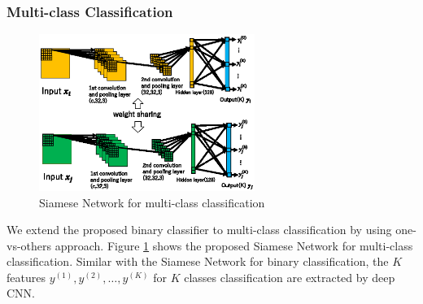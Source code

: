 \documentclass[twocolumn,10pt]{article}
\begin{document}
\subsubsection{Multi-class Classification}
\begin{figure}[ht]
\begin{center}
\includegraphics[width=70mm]{figure3.eps}
\caption{Siamese Network for multi-class classification}
\label{fig:siamese-mu}
\end{center}
\end{figure}
We extend the proposed binary classifier to multi-class classification by using one-vs-others approach.
Figure \ref{fig:siamese-mu} shows the proposed Siamese Network for multi-class classification.
Similar with the Siamese Network for binary classification, the $K$ features $y^{(1)},y^{(2)},\ldots,y^{(K)}$ for $K$ classes classification are extracted by deep CNN.
\end{document}
